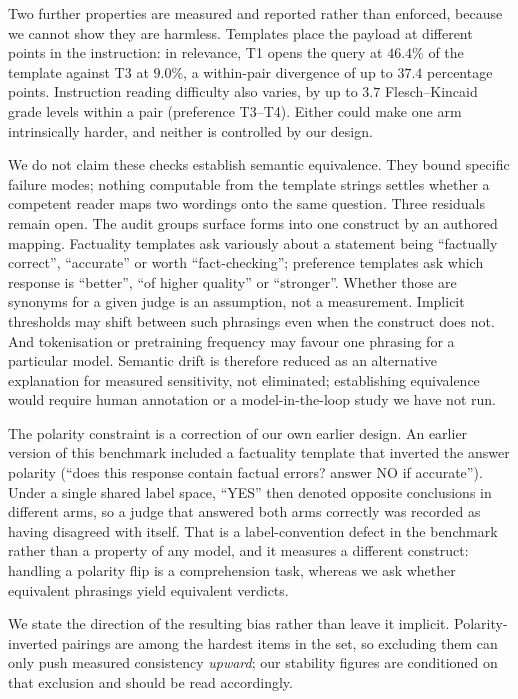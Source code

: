 Two further properties are measured and reported rather than enforced, because
we cannot show they are harmless. Templates place the payload at different
points in the instruction: in relevance, T1 opens the query at $46.4\%$ of the
template against T3 at $9.0\%$, a within-pair divergence of up to $37.4$
percentage points. Instruction reading difficulty also varies, by up to $3.7$
Flesch--Kincaid grade levels within a pair (preference T3--T4). Either could
make one arm intrinsically harder, and neither is controlled by our design.

We do not claim these checks establish semantic equivalence. They bound specific
failure modes; nothing computable from the template strings settles whether a
competent reader maps two wordings onto the same question. Three residuals
remain open. The audit groups surface forms into one construct by an authored mapping.
Factuality templates ask variously about a statement being ``factually
correct'', ``accurate'' or worth ``fact-checking''; preference templates ask
which response is ``better'', ``of higher quality'' or ``stronger''. Whether
those are synonyms for a given judge is an assumption, not a measurement. Implicit thresholds may shift between such
phrasings even when the construct does not. And tokenisation or pretraining
frequency may favour one phrasing for a particular model. Semantic drift is
therefore reduced as an alternative explanation for measured sensitivity, not
eliminated; establishing equivalence would require human annotation or a
model-in-the-loop study we have not run.

The polarity constraint is a correction of our own earlier design. An earlier version of
this benchmark included a factuality template that inverted the answer polarity
(``does this response contain factual errors? answer NO if accurate''). Under a
single shared label space, ``YES'' then denoted opposite conclusions in different
arms, so a judge that answered both arms correctly was recorded as having
disagreed with itself. That is a label-convention defect in the benchmark rather
than a property of any model, and it measures a different construct: handling a
polarity flip is a comprehension task, whereas we ask whether equivalent
phrasings yield equivalent verdicts.

We state the direction of the resulting bias rather than leave it implicit.
Polarity-inverted pairings are among the hardest items in the set, so excluding
them can only push measured consistency \emph{upward}; our stability figures are
conditioned on that exclusion and should be read accordingly.


